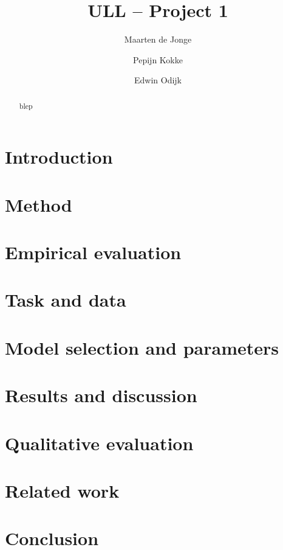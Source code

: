 \documentclass[11pt]{article}
\title{ULL -- Project 1}
\author{Maarten de Jonge \and Pepijn Kokke \and Edwin Odijk}
\date{}
\begin{document}
\maketitle

\begin{abstract}
blep
\end{abstract}

\section{Introduction}

\section{Method}

\section{Empirical evaluation}

\section{Task and data}

\section{Model selection and parameters}

\section{Results and discussion}

\section{Qualitative evaluation}
    
\section{Related work}
    
\section{Conclusion}
\end{document}
